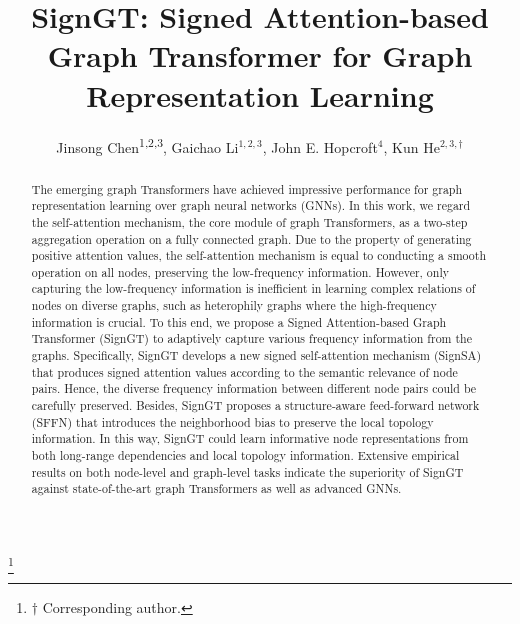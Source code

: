 \documentclass[sigconf, screen]{acmart}
\begin{document}
\title{SignGT: Signed Attention-based Graph Transformer for Graph Representation Learning}

\author{Jinsong Chen\textsuperscript{1,2,3}, Gaichao Li$^{1,2,3}$, John E. Hopcroft$^{4}$, Kun He$^{2,3,\dag}$}

\thanks{$\dag$ Corresponding author.}

\def\authors{Jinsong Chen, Gaichao Li, John E. Hopcroft, Kun He}

\renewcommand{\shortauthors}{Chen, et al.}

\begin{abstract}
The emerging graph Transformers have achieved impressive performance for graph representation learning over graph neural networks (GNNs). In this work, we regard the self-attention mechanism,  the core module of graph Transformers, as a two-step aggregation operation on a fully connected graph. Due to the property of generating positive attention values, the self-attention mechanism is equal to conducting a smooth operation on all nodes, preserving the low-frequency information. However, only capturing the low-frequency information is inefficient in learning complex relations of nodes on diverse graphs, such as heterophily graphs where the high-frequency information is crucial. To this end, we propose a Signed Attention-based Graph Transformer (SignGT) to adaptively capture various frequency information from the graphs. Specifically, SignGT develops a new signed self-attention mechanism (SignSA) that produces signed attention values according to the semantic relevance of node pairs. Hence, the diverse frequency information between different node pairs could be carefully preserved. Besides, SignGT proposes a structure-aware feed-forward network (SFFN) that introduces the neighborhood bias to preserve the local topology information. In this way, SignGT could learn informative node representations from both long-range dependencies and local topology information. Extensive empirical results on both node-level and graph-level tasks indicate the superiority of SignGT against state-of-the-art graph Transformers as well as advanced GNNs.
\end{abstract}
\end{document}
